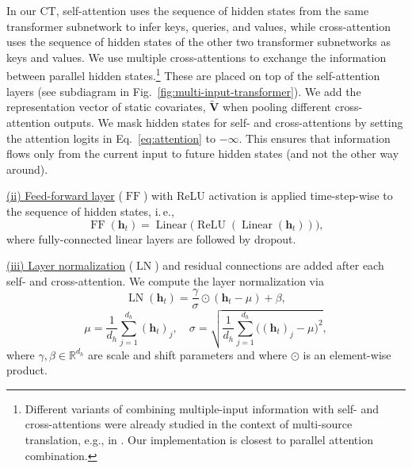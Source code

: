 \documentclass{article}
\newcommand\ie{i.\,e.\xspace}
\theoremstyle{plain}
\theoremstyle{definition}
\theoremstyle{remark}
\newcommand{\shortname}{CT\xspace}
\begin{document}
In our \shortname, self-attention uses the sequence of hidden states from the same transformer subnetwork to infer keys, queries, and values, while cross-attention uses the sequence of hidden states of the other two transformer subnetworks as keys and values. We use multiple cross-attentions to exchange the information between parallel hidden states.\footnote{Different variants of combining multiple-input information with self- and cross-attentions were already studied in the context of multi-source translation, e.g., in \cite{libovicky2018input}. Our implementation is closest to parallel attention combination.} These are placed on top of the self-attention layers (see subdiagram in Fig.~\ref{fig:multi-input-transformer}). We add the representation vector of static covariates, $\tilde{\mathbf{V}}$ when pooling different cross-attention outputs. We mask hidden states for self- and cross-attentions by setting the attention logits in Eq.~\eqref{eq:attention} to $-\infty$. This ensures that information flows only from the current input to future hidden states (and not the other way around). 


\underline{(ii) Feed-forward layer} ($\operatorname{FF}$) with ReLU activation is applied time-step-wise to the sequence of hidden states, \ie,
\begin{equation*}
    \operatorname{FF}(\mathbf{h}_t) = \operatorname{Linear} \big( \operatorname{ReLU}
     (\operatorname{Linear}(\mathbf{h}_t))\big),
\end{equation*}
where fully-connected linear layers are followed by dropout.

\underline{(iii) Layer normalization} ($\operatorname{LN}$) \cite{lei2016layer} and residual connections are added after each self- and cross-attention. We compute the layer normalization via
\begin{equation}
    \operatorname{LN}(\mathbf{h}_t) = \frac{\gamma}{\sigma} \odot (\mathbf{h}_t - \mu) + \beta ,
\end{equation}
\begin{equation}
    \mu = \frac{1}{d_h} \sum_{j=1}^{d_h} (\mathbf{h}_t)_j, \quad \sigma = \sqrt{\frac{1}{d_h} \sum_{j=1}^{d_h} \big((\mathbf{h}_t)_j - \mu \big)^2} ,
\end{equation}
where $\gamma, \beta \in \mathbb{R}^{d_h}$ are scale and shift parameters and where $\odot$ is an element-wise product. 
\end{document}
